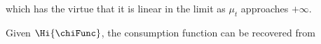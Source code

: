   which has the virtue that it is linear in the limit as $\mu_{t}$ approaches $+\infty$.

  Given $\Hi{\chiFunc}$, the consumption function can be recovered from
